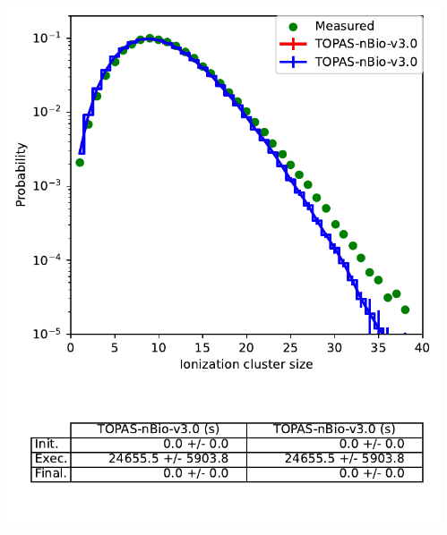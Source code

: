\documentclass[aspectratio=1610]{beamer}
\begin{document}
\begin{frame}{\secname}
  \begin{columns}
    \begin{column}{0.4\linewidth}
     \includegraphics[width=\textwidth]{./NanodosimetryI/IDDistribution_TsEmDNAPhysics}
    \end{column}
    \begin{column}{0.4\linewidth} 

\end{column}
\end{columns}
\end{frame}
\end{document}
